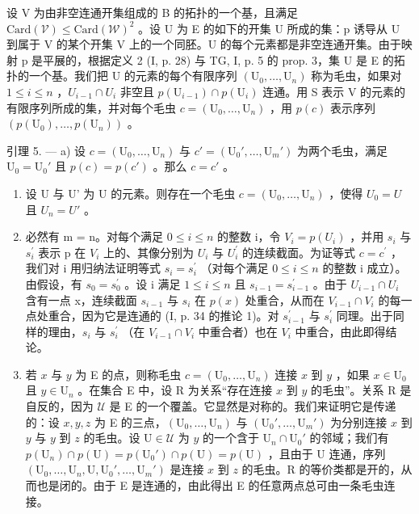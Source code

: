 设 V 为由非空连通开集组成的 B 的拓扑的一个基，且满足 \(\text{Card}(\mathcal{V}) \leqslant \text{Card}(\mathcal{W})^{2}\) 。设 U 为 E 的如下的开集 U 所成的集：p 诱导从 U 到属于 V 的某个开集 V 上的一个同胚。U 的每个元素都是非空连通开集。由于映射 p 是平展的，根据定义 2 (I, p. 28) 与 TG, I, p. 5 的 prop. 3，集 U 是 E 的拓扑的一个基。我们把 U 的元素的每个有限序列 \((\mathrm{U}_{0}, \ldots, \mathrm{U}_{n})\) 称为毛虫，如果对 \(1 \leqslant i \leqslant n\) ，\(U_{i-1} \cap U_{i}\) 非空且 \(p(\mathrm{U}_{i-1}) \cap p(\mathrm{U}_{i})\) 连通。用 S 表示 V 的元素的有限序列所成的集，并对每个毛虫 \(c = (\mathrm{U}_{0}, \ldots, \mathrm{U}_{n})\) ，用 \(p(c)\) 表示序列 \((p(\mathrm{U}_{0}), \ldots, p(\mathrm{U}_{n}))\) 。

引理 5. --- a) 设 \(c = (\mathrm{U}_0, \ldots, \mathrm{U}_n)\) 与 \(c' = (\mathrm{U}_0', \ldots, \mathrm{U}_m')\) 为两个毛虫，满足 \(\mathrm{U}_0 = \mathrm{U}_0'\) 且 \(p(c) = p(c')\) 。那么 \(c = c'\) 。

\begin{enumerate}
\def\labelenumi{\alph{enumi})}
\setcounter{enumi}{1}
\item
  设 U 与 U' 为 U 的元素。则存在一个毛虫 \(c = (\mathrm{U}_{0}, \ldots, \mathrm{U}_{n})\) ，使得 \(U_{0} = U\) 且 \(U_{n} = U'\) 。
\item
  必然有 m = n。对每个满足 \(0 \leqslant i \leqslant n\) 的整数 i，令 \(V_{i} = p(U_{i})\) ，并用 \(s_{i}\) 与 \(s_{i}^{\prime}\) 表示 p 在 \(V_{i}\) 上的、其像分别为 \(U_{i}\) 与 \(U_{i}^{\prime}\) 的连续截面。为证等式 \(c = c^{\prime}\) ，我们对 i 用归纳法证明等式 \(s_{i} = s_{i}^{\prime}\) （对每个满足 \(0 \leqslant i \leqslant n\) 的整数 i 成立）。由假设，有 \(s_{0} = s_{0}^{\prime}\) 。设 i 满足 \(1 \leqslant i \leqslant n\) 且 \(s_{i-1} = s_{i-1}^{\prime}\) 。由于 \(U_{i-1} \cap U_{i}\) 含有一点 x，连续截面 \(s_{i-1}\) 与 \(s_{i}\) 在 \(p(x)\) 处重合，从而在 \(V_{i-1} \cap V_{i}\) 的每一点处重合，因为它是连通的 (I, p. 34 的推论 1)。对 \(s_{i-1}^{\prime}\) 与 \(s_{i}^{\prime}\) 同理。出于同样的理由，\(s_{i}\) 与 \(s_{i}^{\prime}\) （在 \(V_{i-1} \cap V_{i}\) 中重合者）也在 \(V_{i}\) 中重合，由此即得结论。
\item
  若 \(x\) 与 \(y\) 为 E 的点，则称毛虫 \(c = (\mathrm{U}_0, \ldots, \mathrm{U}_n)\) 连接 \(x\) 到 \(y\) ，如果 \(x \in \mathrm{U}_0\) 且 \(y \in \mathrm{U}_n\) 。在集合 E 中，设 R 为关系“存在连接 \(x\) 到 \(y\) 的毛虫”。关系 R 是自反的，因为 \(\mathcal{U}\) 是 E 的一个覆盖。它显然是对称的。我们来证明它是传递的：设 \(x, y, z\) 为 E 的三点，\((\mathrm{U}_0, \ldots, \mathrm{U}_n)\) 与 \((\mathrm{U}_0', \ldots, \mathrm{U}_m')\) 为分别连接 \(x\) 到 \(y\) 与 \(y\) 到 \(z\) 的毛虫。设 \(\mathrm{U} \in \mathcal{U}\) 为 \(y\) 的一个含于 \(\mathrm{U}_n \cap \mathrm{U}_0'\) 的邻域；我们有 \(p(\mathrm{U}_n) \cap p(\mathrm{U}) = p(\mathrm{U}_0') \cap p(\mathrm{U}) = p(\mathrm{U})\) ，且由于 U 连通，序列 \((\mathrm{U}_0, \ldots, \mathrm{U}_n, \mathrm{U}, \mathrm{U}_0', \ldots, \mathrm{U}_m')\) 是连接 \(x\) 到 \(z\) 的毛虫。R 的等价类都是开的，从而也是闭的。由于 E 是连通的，由此得出 E 的任意两点总可由一条毛虫连接。
\end{enumerate}

